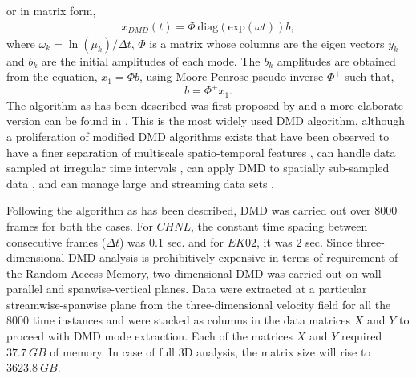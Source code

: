 or in matrix form, 
\begin{align}
x_{DMD}(t)= \Phi\  \text{diag}(\text{exp}(\omega t)) b,
\end{align}
where $\omega_k = \ln (\mu_{k})/ \Delta t$, $\Phi$ is a matrix whose columns are the eigen vectors $y_{k} $ and $b_{k}$ are the initial amplitudes of each mode. The $b_{k}$ amplitudes are obtained from the equation, $x_1=\Phi b$, using Moore-Penrose pseudo-inverse $\Phi^{+}$ such that,
\begin{equation}
 b = \Phi^{+}x_{1} .
\end{equation}
The algorithm as has been described was first proposed by \citet{schmid_jfm2010} and a more elaborate version can be found in \citep{kutz_book2013, rowley_mezic_schlatter_jfm_2009,tu_thesis}. This is the most widely used DMD algorithm, although a proliferation of modified DMD algorithms exists that have been observed to have a finer separation of multiscale spatio-temporal features \citep[e.g., ][]{kutz_fu_brunton_siam_2016}, can handle data sampled at irregular time intervals \citep[][]{tu_thesis}, can apply DMD to spatially sub-sampled data \citep{florimond_mathelin_pof_2015}, and can manage large and streaming data sets \citep{hemati_pof_2014}.

Following the algorithm as has been described, DMD was carried out over 8000 frames for both the cases. For $CHNL$, the constant time spacing between consecutive frames ($\Delta t$) was $0.1$ sec. and for $EK02$, it was $2$ sec. Since three-dimensional DMD analysis is prohibitively expensive in terms of requirement of the Random Access Memory, two-dimensional DMD was carried out on wall parallel and spanwise-vertical planes. Data were extracted at a particular streamwise-spanwise plane from the three-dimensional velocity field for all the 8000 time instances and were stacked as columns in the data matrices $X$ and $Y$ to proceed with DMD mode extraction. Each of the matrices  $X$ and $Y$ required $37.7\ GB$ of memory. In case of full 3D analysis, the matrix size will rise to $3623.8\ GB$. 

